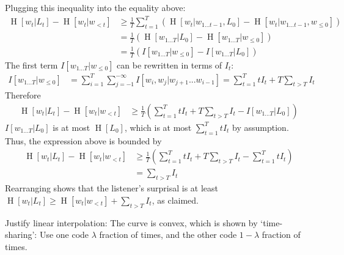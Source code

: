 	Plugging this inequality into the equality above:
\begin{align*}
	\operatorname{H}[w_t | L_t] - \operatorname{H}[w_t | w_{<t}]& \geq \frac{1}{T} \sum_{t=1}^T ( \operatorname{H}[w_t|w_{1\dots t-1}, L_0] - \operatorname{H}[w_t | w_{1\dots t-1}, w_{\leq 0}]  )    \\
	& = \frac{1}{T} \left(\operatorname{H}[w_{1\dots T} | L_0] - \operatorname{H}[w_{1\dots T} | w_{\leq 0}]\right)  \\
	& = \frac{1}{T} \left(I[w_{1\dots T}|w_{\leq 0}] - I[w_{1\dots T}|L_0]\right) 
\end{align*}
	The first term $I[w_{1\dots T}|w_{\leq 0}]$ can be rewritten in terms of $I_t$:
	\begin{align*}
		I[w_{1\dots T}|w_{\leq 0}] &= \sum_{i=1}^T \sum_{j=-1}^{-\infty} I[w_i, w_j | w_{j+1}...w_{i-1}] = \sum_{t=1}^T t I_t + T \sum_{t > T} I_t
	\end{align*}
	Therefore
\begin{align*}
	\operatorname{H}[w_t | L_t] - \operatorname{H}[w_t | w_{<t}]& \geq \frac{1}{T} \left(\sum_{t=1}^T t I_t + T \sum_{t > T} I_t - I[w_{1\dots T}|L_0]\right) 
\end{align*}
	$I[w_{1\dots T}|L_0]$ is at most $\operatorname{H}[L_0]$, which is at most $\sum_{t=1}^T t I_t$ by assumption. Thus, the expression above is bounded by
	\begin{align*}
	\operatorname{H}[w_t | L_t] - \operatorname{H}[w_t | w_{<t}]& \geq \frac{1}{T} \left(\sum_{t=1}^T t I_t + T \sum_{t > T} I_t - \sum_{t=1}^T t I_t\right) \\
		&= \sum_{t > T} I_t
\end{align*}
	Rearranging shows that the listener's surprisal is at least $\operatorname{H}[w_t|L_t] \geq \operatorname{H}[w_t | w_{<t}] + \sum_{t > T} I_t$, as claimed.


Justify linear interpolation: The curve is convex, which is shown by `time-sharing': Use one code $\lambda$ fraction of times, and the other code $1-\lambda$ fraction of times.

